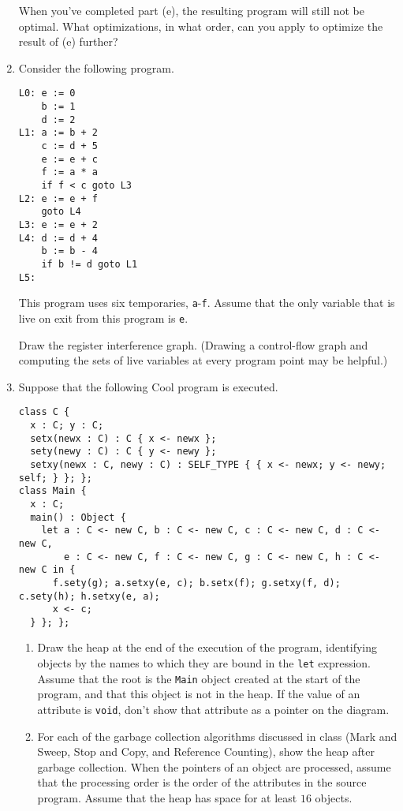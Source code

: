 \documentclass[11pt]{article}
\begin{document}
\begin{enumerate}
When you've completed part (e), the resulting program will still not
be optimal.  What optimizations, in what order, can you apply to
optimize the result of (e) further?

\item
Consider the following program.
\vspace{-0.5\baselineskip}
\begin{verbatim}
L0: e := 0
    b := 1
    d := 2
L1: a := b + 2
    c := d + 5
    e := e + c
    f := a * a
    if f < c goto L3
L2: e := e + f
    goto L4
L3: e := e + 2
L4: d := d + 4
    b := b - 4
    if b != d goto L1
L5:
\end{verbatim}

\vspace{-0.5\baselineskip}
This program uses six temporaries, \texttt{a}-\texttt{f}.  Assume that
the only variable that is live on exit from this program is
\texttt{e}.

Draw the register interference graph.  (Drawing a control-flow graph
and computing the sets of live variables at every program point may be
helpful.)

\item
Suppose that the following Cool program is executed.
\vspace{-0.5\baselineskip}
\begin{verbatim}
class C {
  x : C; y : C;
  setx(newx : C) : C { x <- newx };
  sety(newy : C) : C { y <- newy };
  setxy(newx : C, newy : C) : SELF_TYPE { { x <- newx; y <- newy; self; } }; };
class Main {
  x : C;
  main() : Object {
    let a : C <- new C, b : C <- new C, c : C <- new C, d : C <- new C,
        e : C <- new C, f : C <- new C, g : C <- new C, h : C <- new C in {
      f.sety(g); a.setxy(e, c); b.setx(f); g.setxy(f, d); c.sety(h); h.setxy(e, a);
      x <- c;
  } }; };
\end{verbatim}

\vspace{-0.75\baselineskip}
\begin{enumerate}
\item
Draw the heap at the end of the execution of the program, identifying
objects by the names to which they are bound in the \texttt{let}
expression.  Assume that the root is the \texttt{Main} object created
at the start of the program, and that this object is not in the heap.
If the value of an attribute is \texttt{void}, don't show that
attribute as a pointer on the diagram.

\item
For each of the garbage collection algorithms discussed in class (Mark
and Sweep, Stop and Copy, and Reference Counting), show the heap after
garbage collection.  When the pointers of an object are processed,
assume that the processing order is the order of the attributes in the
source program.  Assume that the heap has space for at least $16$
objects.
\end{enumerate}

\end{enumerate}
\end{document}
